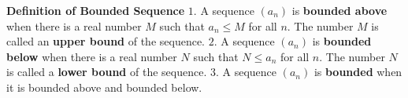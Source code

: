 \nopagenumbers
{\bf Definition of Bounded Sequence}
\vskip 6pt
$1.$ A sequence $(a_n)$ is {\bf bounded above} when there is a real number $M$ such that $a_n \leq M$ for all $n$. The number $M$ is called an {\bf upper bound} of the sequence.
\vskip 2mm
$2.$ A sequence $(a_n)$ is {\bf bounded below} when there is a real number $N$ such that $N \leq a_n$ for all $n$. The number $N$ is called a {\bf lower bound} of the sequence.
\vskip 2mm
$3.$ A sequence $(a_n)$ is {\bf bounded} when it is bounded above and bounded below.

\vfill\eject
